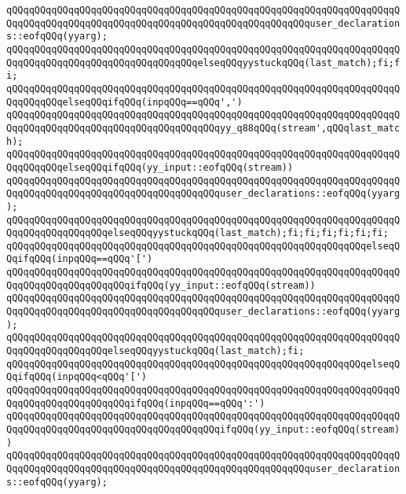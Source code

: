 \verb|qQQqqQQqqQQqqQQqqQQqqQQqqQQqqQQqqQQqqQQqqQQqqQQqqQQqqQQqqQQqqQQqqQQqqQQqqQQqqQQqqQQqqQQqqQQqqQQqqQQqqQQqqQQqqQQqqQQqqQQqqQQquser_declarations::eofqQQq(yyarg);|\newline
\verb|qQQqqQQqqQQqqQQqqQQqqQQqqQQqqQQqqQQqqQQqqQQqqQQqqQQqqQQqqQQqqQQqqQQqqQQqqQQqqQQqqQQqqQQqqQQqqQQqqQQqqQQqelseqQQqyystuckqQQq(last_match);fi;fi;|\newline
\verb|qQQqqQQqqQQqqQQqqQQqqQQqqQQqqQQqqQQqqQQqqQQqqQQqqQQqqQQqqQQqqQQqqQQqqQQqqQQqqQQqelseqQQqifqQQq(inpqQQq==qQQq',')|\newline
\verb|qQQqqQQqqQQqqQQqqQQqqQQqqQQqqQQqqQQqqQQqqQQqqQQqqQQqqQQqqQQqqQQqqQQqqQQqqQQqqQQqqQQqqQQqqQQqqQQqqQQqqQQqqQQqyy_q88qQQq(stream',qQQqlast_match);|\newline
\verb|qQQqqQQqqQQqqQQqqQQqqQQqqQQqqQQqqQQqqQQqqQQqqQQqqQQqqQQqqQQqqQQqqQQqqQQqqQQqqQQqelseqQQqifqQQq(yy_input::eofqQQq(stream))|\newline
\verb|qQQqqQQqqQQqqQQqqQQqqQQqqQQqqQQqqQQqqQQqqQQqqQQqqQQqqQQqqQQqqQQqqQQqqQQqqQQqqQQqqQQqqQQqqQQqqQQqqQQqqQQqqQQquser_declarations::eofqQQq(yyarg);|\newline
\verb|qQQqqQQqqQQqqQQqqQQqqQQqqQQqqQQqqQQqqQQqqQQqqQQqqQQqqQQqqQQqqQQqqQQqqQQqqQQqqQQqqQQqqQQqelseqQQqyystuckqQQq(last_match);fi;fi;fi;fi;fi;fi;|\newline
\verb|qQQqqQQqqQQqqQQqqQQqqQQqqQQqqQQqqQQqqQQqqQQqqQQqqQQqqQQqqQQqqQQqelseqQQqifqQQq(inpqQQq==qQQq'[')|\newline
\verb|qQQqqQQqqQQqqQQqqQQqqQQqqQQqqQQqqQQqqQQqqQQqqQQqqQQqqQQqqQQqqQQqqQQqqQQqqQQqqQQqqQQqqQQqqQQqifqQQq(yy_input::eofqQQq(stream))|\newline
\verb|qQQqqQQqqQQqqQQqqQQqqQQqqQQqqQQqqQQqqQQqqQQqqQQqqQQqqQQqqQQqqQQqqQQqqQQqqQQqqQQqqQQqqQQqqQQqqQQqqQQqqQQqqQQquser_declarations::eofqQQq(yyarg);|\newline
\verb|qQQqqQQqqQQqqQQqqQQqqQQqqQQqqQQqqQQqqQQqqQQqqQQqqQQqqQQqqQQqqQQqqQQqqQQqqQQqqQQqqQQqqQQqelseqQQqyystuckqQQq(last_match);fi;|\newline
\verb|qQQqqQQqqQQqqQQqqQQqqQQqqQQqqQQqqQQqqQQqqQQqqQQqqQQqqQQqqQQqqQQqelseqQQqifqQQq(inpqQQq<qQQq'[')|\newline
\verb|qQQqqQQqqQQqqQQqqQQqqQQqqQQqqQQqqQQqqQQqqQQqqQQqqQQqqQQqqQQqqQQqqQQqqQQqqQQqqQQqqQQqqQQqqQQqifqQQq(inpqQQq==qQQq':')|\newline
\verb|qQQqqQQqqQQqqQQqqQQqqQQqqQQqqQQqqQQqqQQqqQQqqQQqqQQqqQQqqQQqqQQqqQQqqQQqqQQqqQQqqQQqqQQqqQQqqQQqqQQqqQQqqQQqifqQQq(yy_input::eofqQQq(stream))|\newline
\verb|qQQqqQQqqQQqqQQqqQQqqQQqqQQqqQQqqQQqqQQqqQQqqQQqqQQqqQQqqQQqqQQqqQQqqQQqqQQqqQQqqQQqqQQqqQQqqQQqqQQqqQQqqQQqqQQqqQQqqQQqqQQquser_declarations::eofqQQq(yyarg);|\newline
